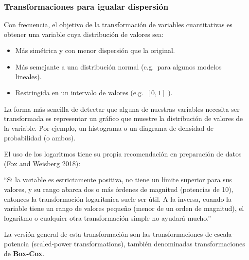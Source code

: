 \documentclass[
  letterpaper,
  DIV=11,
  numbers=noendperiod]{scrreprt}
\begin{document}
\hypertarget{transformaciones-para-igualar-dispersiuxf3n}{%
\subsubsection{Transformaciones para igualar
dispersión}\label{transformaciones-para-igualar-dispersiuxf3n}}

Con frecuencia, el objetivo de la transformación de variables
cuantitativas es obtener una variable cuya distribución de valores sea:

\begin{itemize}
\item
  Más simétrica y con menor dispersión que la original.
\item
  Más semejante a una distribución normal (e.g.~para algunos modelos
  lineales).
\item
  Restringida en un intervalo de valores (e.g.~\([0,1]\) ).
\end{itemize}

La forma más sencilla de detectar que alguna de nuestras variables
necesita ser transformada es representar un gráfico que muestre la
distribución de valores de la variable. Por ejemplo, un histograma o un
diagrama de densidad de probabilidad (o ambos).

El uso de los logaritmos tiene su propia recomendación en preparación de
datos (Fox and Weisberg 2018):

\begin{tcolorbox}[enhanced jigsaw, arc=.35mm, breakable, coltitle=black, left=2mm, opacityback=0, bottomtitle=1mm, colbacktitle=quarto-callout-tip-color!10!white, title=\textcolor{quarto-callout-tip-color}{\faLightbulb}\hspace{0.5em}{John Fox}, titlerule=0mm, colback=white, colframe=quarto-callout-tip-color-frame, bottomrule=.15mm, rightrule=.15mm, opacitybacktitle=0.6, toptitle=1mm, toprule=.15mm, leftrule=.75mm]

``Si la variable es estrictamente positiva, no tiene un límite superior
para sus valores, y su rango abarca dos o más órdenes de magnitud
(potencias de 10), entonces la transformación logarítmica suele ser
útil. A la inversa, cuando la variable tiene un rango de valores pequeño
(menor de un orden de magnitud), el logaritmo o cualquier otra
transformación simple no ayudará mucho.''

\end{tcolorbox}

La versión general de esta transformación son las transformaciones de
escala-potencia (scaled-power transformations), también denominadas
transformaciones de \textbf{Box-Cox}.
\end{document}
